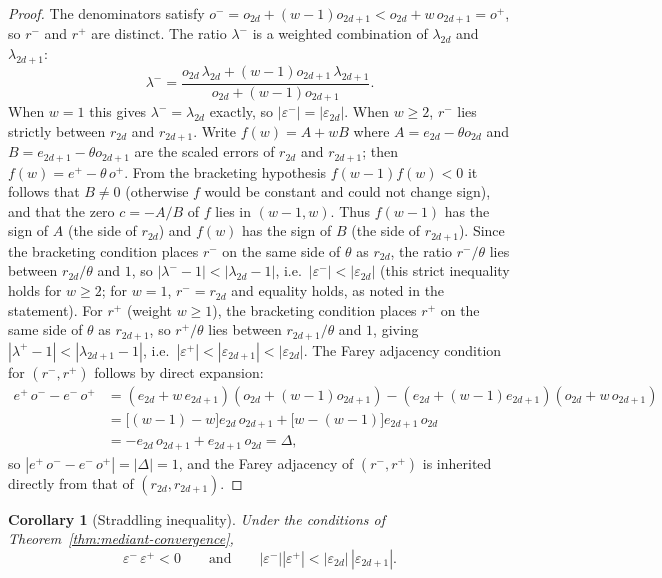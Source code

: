 \documentclass[12pt]{article}
\newtheorem{corollary}[theorem]{Corollary}
\theoremstyle{definition}
\theoremstyle{remark}
\theoremstyle{plain}
\newcommand{\lam}{\lambda}
\newcommand{\eps}{\varepsilon}
\newcommand{\Dval}{\Delta}
\newcommand{\rplus}{r^{+}}
\newcommand{\rminus}{r^{-}}
\newcommand{\eplus}{e^{+}}
\newcommand{\eminus}{e^{-}}
\newcommand{\odenp}{o^{+}}
\newcommand{\odenm}{o^{-}}
\newcommand{\epsplus}{\eps^{+}}
\newcommand{\epsminus}{\eps^{-}}
\newcommand{\lamplus}{\lam^{+}}
\newcommand{\lamminus}{\lam^{-}}
\begin{document}
\begin{proof}
The denominators satisfy $\odenm = o_{2d} + (w-1)o_{2d+1} < o_{2d} + w\,o_{2d+1} = \odenp$, so
$\rminus$ and $\rplus$ are distinct.
The ratio $\lamminus$ is a weighted combination of $\lam_{2d}$ and $\lam_{2d+1}$:
\[
  \lamminus = \frac{o_{2d}\,\lam_{2d} + (w-1)o_{2d+1}\,\lam_{2d+1}}{o_{2d} + (w-1)o_{2d+1}}.
\]
When $w = 1$ this gives $\lamminus = \lam_{2d}$ exactly, so $|\epsminus| = |\eps_{2d}|$.
When $w \geq 2$, $\rminus$ lies strictly between $r_{2d}$ and $r_{2d+1}$.
Write $f(w) = A + wB$ where $A = e_{2d} - \theta o_{2d}$ and $B = e_{2d+1} - \theta o_{2d+1}$
are the scaled errors of $r_{2d}$ and $r_{2d+1}$; then $f(w) = \eplus - \theta\,\odenp$.
From the bracketing hypothesis $f(w-1)f(w) < 0$ it follows that $B \neq 0$
(otherwise $f$ would be constant and could not change sign), and that the zero
$c = -A/B$ of $f$ lies in $(w-1, w)$.
Thus $f(w-1)$ has the sign of $A$ (the side of $r_{2d}$) and $f(w)$ has the sign of $B$
(the side of $r_{2d+1}$).
Since the bracketing condition places $\rminus$ on the same side of $\theta$ as $r_{2d}$,
the ratio $\rminus/\theta$ lies between $r_{2d}/\theta$ and $1$,
so $|\lamminus - 1| < |\lam_{2d} - 1|$, i.e.\ $|\epsminus| < |\eps_{2d}|$
(this strict inequality holds for $w \ge 2$; for $w = 1$, $\rminus = r_{2d}$ and equality holds,
as noted in the statement).
For $\rplus$ (weight $w \geq 1$), the bracketing condition places $\rplus$ on the same side
of $\theta$ as $r_{2d+1}$, so $\rplus/\theta$ lies between $r_{2d+1}/\theta$ and $1$,
giving $|\lamplus - 1| < |\lam_{2d+1} - 1|$, i.e.\ $|\epsplus| < |\eps_{2d+1}| < |\eps_{2d}|$.
The Farey adjacency condition for $(\rminus, \rplus)$ follows by direct expansion:
\begin{align*}
  \eplus\,\odenm - \eminus\,\odenp
    &= (e_{2d} + w\,e_{2d+1})(o_{2d} + (w-1)o_{2d+1})
     - (e_{2d} + (w-1)e_{2d+1})(o_{2d} + w\,o_{2d+1}) \\
    &= \bigl[(w-1) - w\bigr]e_{2d}\,o_{2d+1}
     + \bigl[w - (w-1)\bigr]e_{2d+1}\,o_{2d} \\
    &= -e_{2d}\,o_{2d+1} + e_{2d+1}\,o_{2d} = \Dval,
\end{align*}
so $|\eplus\,\odenm - \eminus\,\odenp| = |\Dval| = 1$, and the Farey adjacency of $(\rminus, \rplus)$
is inherited directly from that of $(r_{2d}, r_{2d+1})$.
\end{proof}

\begin{corollary}[Straddling inequality]
\label{cor:straddling}
Under the conditions of Theorem~\ref{thm:mediant-convergence},
\[
  \epsminus\,\epsplus < 0 \qquad \text{and} \qquad |\epsminus||\epsplus| < |\eps_{2d}|\,|\eps_{2d+1}|.
\]
\end{corollary}
\end{document}
